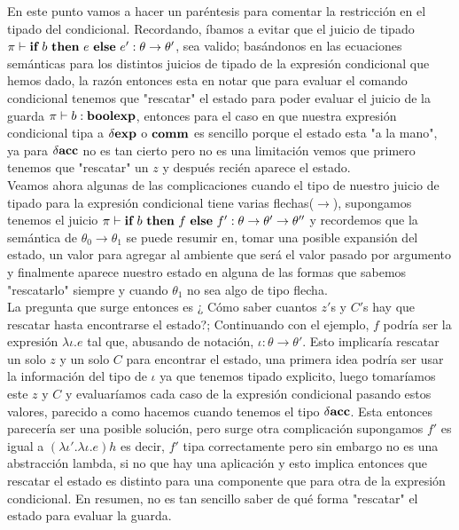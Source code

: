 En este punto vamos a hacer un par\'entesis para comentar la restricci\'on
en el tipado del condicional. Recordando, \'ibamos a evitar que el juicio de tipado
$\pi \vdash \textbf{if} \ b \ \textbf{then} \ e \ \textbf{else} \ e' : \theta \rightarrow \theta'$, 
sea valido; bas\'andonos en las ecuaciones sem\'anticas para los 
distintos juicios de tipado de la expresi\'on condicional que hemos
dado, la raz\'on entonces esta en notar que para evaluar el comando
condicional tenemos que "rescatar" el estado para poder evaluar
el juicio de la guarda $\pi \vdash b : \textbf{boolexp}$, entonces para
el caso en que nuestra expresi\'on condicional tipa a 
$\delta \textbf{exp}$ o $\textbf{comm}$ es sencillo porque el estado esta "a la mano",
ya para $\delta \textbf{acc}$ no es tan cierto pero no es una limitaci\'on vemos
que primero tenemos que "rescatar" un $z$ y despu\'es reci\'en aparece
el estado. \\
Veamos ahora algunas de las complicaciones cuando
el tipo de nuestro juicio de tipado para la expresi\'on condicional 
tiene varias flechas($\rightarrow$), supongamos tenemos el juicio
$\pi \vdash \textbf{if} \ b \ \textbf{then} \ f \ \textbf{else} \ f' : \theta \rightarrow \theta' \rightarrow \theta''$ y
recordemos que la sem\'antica de $\theta_0 \rightarrow \theta_1$ se puede 
resumir en, tomar una posible expansi\'on del estado, un valor para agregar 
al ambiente que
ser\'a el valor pasado por argumento y finalmente aparece nuestro estado 
en alguna de las formas que sabemos "rescatarlo" siempre y cuando $\theta_1$
no sea algo de tipo flecha.\\
La pregunta que surge entonces es 
¿ C\'omo saber cuantos $z'$s y $C'$s hay que rescatar hasta encontrarse el estado?; 
Continuando con el ejemplo, $f$ podr\'ia ser la expresi\'on $\lambda \iota. e$ tal que, 
abusando de notaci\'on, $\iota : \theta \rightarrow \theta'$. Esto 
implicar\'ia rescatar un solo $z$ y un solo $C$ para encontrar el estado, una 
primera idea podr\'ia ser usar la informaci\'on del tipo de $\iota$ ya que tenemos
tipado explicito, luego 
tomar\'iamos este $z$ y $C$ y evaluar\'iamos cada caso de la expresi\'on
condicional pasando estos valores, parecido a como hacemos cuando
tenemos el tipo $\delta \textbf{acc}$. Esta entonces parecer\'ia ser una posible 
soluci\'on, pero surge otra complicaci\'on supongamos $f'$ es igual a
$(\lambda \iota' . \lambda \iota . e)h$ es decir, $f'$ tipa correctamente pero
sin embargo no es una abstracci\'on lambda, si no que hay una aplicaci\'on
y esto implica entonces que rescatar el estado es distinto para una componente
que para otra de la expresi\'on condicional. En resumen, no es tan sencillo
saber de qu\'e forma "rescatar" el estado para evaluar la guarda.\\

